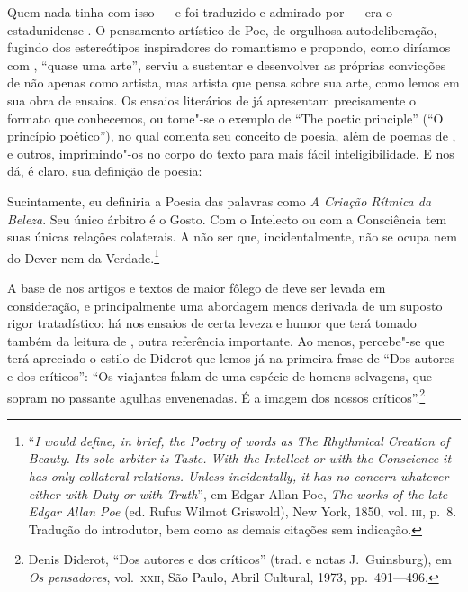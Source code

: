Quem nada tinha com isso --- e foi traduzido e admirado por 
--- era o estadunidense . 
O pensamento artístico de Poe, de orgulhosa autodeliberação,
fugindo dos estereótipos inspiradores do romantismo e propondo, como
diríamos com , “quase uma arte”, serviu a sustentar e
desenvolver as próprias convicções de  não apenas como
artista, mas artista que pensa sobre sua arte, como lemos em sua obra
de ensaios. Os ensaios literários de  já apresentam precisamente o
formato que conhecemos, ou tome"-se o exemplo de “The poetic principle”
(``O princípio poético''), no qual comenta seu conceito de poesia, além de
poemas de ,  e outros, imprimindo"-os no corpo do texto para
mais fácil inteligibilidade. E nos dá, é claro, sua definição de
poesia:

\begin{hedraquote}
Sucintamente, eu definiria a Poesia das palavras como
\textit{A Criação Rítmica da Beleza}. Seu único árbitro é o Gosto. Com
o Intelecto ou com a Consciência tem suas únicas relações colaterais. A
não ser que, incidentalmente, não se ocupa nem do Dever nem da Verdade.\footnote{ ``\textit{I 
would define, in brief, the Poetry of words as \textit{The Rhythmical
Creation of Beauty.} Its sole arbiter is Taste. With the Intellect or
with the Conscience it has only collateral relations. Unless
incidentally, it has no concern whatever either with Duty or with
Truth}'',
em Edgar Allan Poe, \textit{The works of the late Edgar
Allan Poe} (ed. Rufus Wilmot Griswold), New York, 1850,  vol. \textsc{iii}, p.~8. 
Tradução do introdutor, bem como as demais citações sem indicação.}
\end{hedraquote}

A base de  nos artigos e textos de maior fôlego de  deve
ser levada em consideração, e principalmente uma abordagem menos
derivada de um suposto rigor tratadístico: há nos ensaios de 
certa leveza e humor que terá tomado também da leitura de ,
outra referência importante. Ao menos, percebe"-se que  terá
apreciado o estilo de Diderot que lemos já na primeira frase de “Dos
autores e dos críticos”: “Os viajantes falam de uma espécie de homens
selvagens, que sopram no passante agulhas envenenadas. É a imagem dos
nossos críticos”.\footnote{ Denis Diderot, “Dos autores e dos críticos”
(trad. e notas J.~Guinsburg), em \textit{Os
pensadores}, vol.~\textsc{xxii}, São Paulo, Abril Cultural, 1973, pp.~491---496.}

